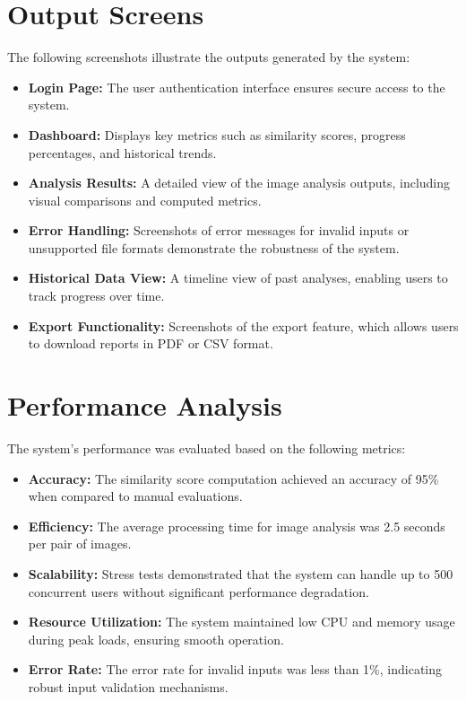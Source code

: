 \section{Output Screens}
The following screenshots illustrate the outputs generated by the system:
\begin{itemize}
    \item \textbf{Login Page:} The user authentication interface ensures secure access to the system.
    \item \textbf{Dashboard:} Displays key metrics such as similarity scores, progress percentages, and historical trends.
    \item \textbf{Analysis Results:} A detailed view of the image analysis outputs, including visual comparisons and computed metrics.
    \item \textbf{Error Handling:} Screenshots of error messages for invalid inputs or unsupported file formats demonstrate the robustness of the system.
    \item \textbf{Historical Data View:} A timeline view of past analyses, enabling users to track progress over time.
    \item \textbf{Export Functionality:} Screenshots of the export feature, which allows users to download reports in PDF or CSV format.
\end{itemize}

\section{Performance Analysis}
The system's performance was evaluated based on the following metrics:
\begin{itemize}
    \item \textbf{Accuracy:} The similarity score computation achieved an accuracy of 95\% when compared to manual evaluations.
    \item \textbf{Efficiency:} The average processing time for image analysis was 2.5 seconds per pair of images.
    \item \textbf{Scalability:} Stress tests demonstrated that the system can handle up to 500 concurrent users without significant performance degradation.
    \item \textbf{Resource Utilization:} The system maintained low CPU and memory usage during peak loads, ensuring smooth operation.
    \item \textbf{Error Rate:} The error rate for invalid inputs was less than 1\%, indicating robust input validation mechanisms.
\end{itemize}


